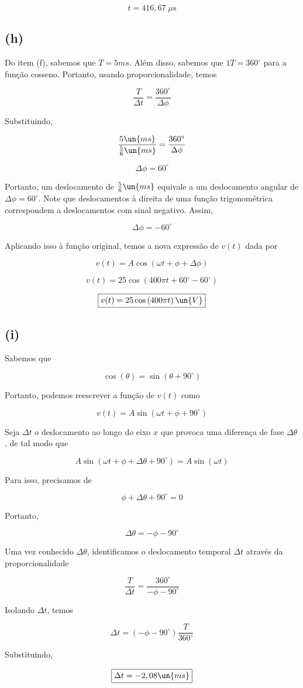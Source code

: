 \[ \boxed{t = 416,67 \;\mu\textrm{s}}  \]

\subsection*{(h)}

Do item (f), sabemos que $T=5ms$. Além disso, sabemos que $1T=360^{\circ}$ para a função cosseno. 
Portanto, usando proporcionalidade, temos

\[ \frac{T}{\Delta t} = \frac{360^{\circ}}{\Delta \phi}  \]

Substituindo,

\[ \frac{5 \un{ms}}{\frac{5}{6} \un{ms}} = \frac{360^{\circ}}{\Delta \phi}  \]

\[ \Delta \phi = 60^{\circ}  \]

Portanto, um deslocamento de $\frac{5}{6} \un{ms}$ equivale a um deslocamento angular de $\Delta \phi = 60^{\circ}$.
Note que deslocamentos à direita de uma função trigonométrica correspondem a deslocamentos com sinal negativo. Assim, 

\[ \Delta \phi = -60^{\circ}  \]

Aplicando isso à função original, temos a nova expressão de $v(t)$ dada por

\[ v(t) = A\cos\left(\omega t + \phi + \Delta \phi\right) \]

\[ v(t) = 25\cos\left(400\pi t + 60^{\circ} - 60^{\circ}\right) \]

\[ \boxed{v(t) = 25\cos\left(400\pi t\right)  \un{V}}  \]

\subsection*{(i)}

Sabemos que

\[ \cos(\theta) = \sin(\theta + 90^{\circ}) \]

Portanto, podemos reescrever a função de $v(t)$ como

\[ v(t) = A\sin\left(\omega t + \phi + 90^{\circ}\right)  \]

Seja $\Delta t$ o deslocamento ao longo do eixo $x$ que provoca uma diferença de fase $\Delta\theta$, de tal modo que

\[ A\sin\left(\omega t + \phi + \Delta\theta + 90^{\circ}\right) =  A\sin\left(\omega t\right)  \]

Para isso, precisamos de

\[ \phi + \Delta\theta + 90^{\circ} = 0 \]

Portanto,

\[ \Delta\theta = - \phi - 90^{\circ} \]

Uma vez conhecido $\Delta\theta$, identificamos o deslocamento temporal $\Delta t$ através da proporcionalidade

\[ \frac{T}{\Delta t} = \frac{360^{\circ}}{- \phi - 90^{\circ}}  \]

Isolando $\Delta t$, temos

\[ \Delta t = (- \phi - 90^{\circ}) \frac{T}{360^{\circ}} \]

Substituindo,

\[ \boxed{\Delta t = - 2,08\un{ms}}  \]

